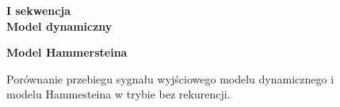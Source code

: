 \begin{figure}[p!]

\begin{center}
\Large \textbf{I sekwencja} \\
\vspace{0.5cm}
\Large \textbf{Model dynamiczny}
\end{center}

\centering
{}
\hfill
{}

\begin{center}
\Large \textbf{Model Hammersteina}
\end{center}

\hfill
{}
\caption{Porównanie przebiegu sygnału wyjściowego modelu dynamicznego i modelu Hammesteina w trybie bez rekurencji.}
\end{figure} 
 
